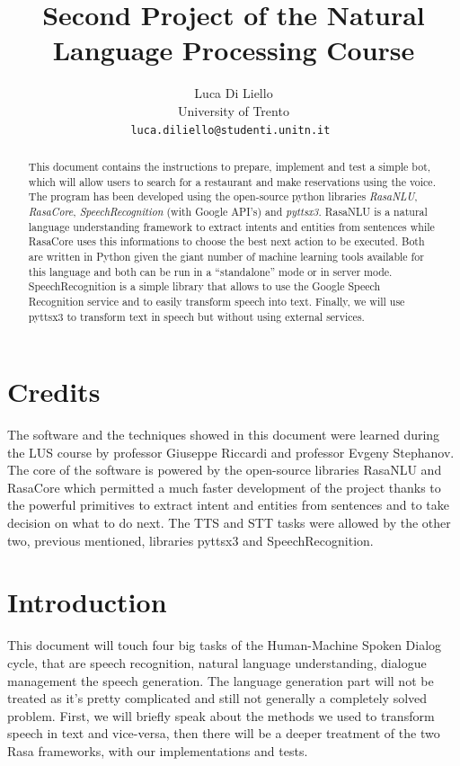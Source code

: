 \documentclass[11pt,a4paper]{article}
\title{Second Project of the Natural Language Processing Course}
\author{Luca Di Liello \\
	University of Trento\\
	{\tt luca.diliello@studenti.unitn.it }
}
\begin{document}
\maketitle

\begin{abstract}

This document contains the instructions to prepare, implement and test a simple bot, which will allow users to search for a restaurant and make reservations using the voice. The program has been developed using the open-source python libraries \textit{RasaNLU}, \textit{RasaCore}, \textit{SpeechRecognition} (with Google API's) and \textit{pyttsx3}. RasaNLU is a natural language understanding framework to extract intents and entities from sentences while RasaCore uses this informations to choose the best next action to be executed. Both are written in Python given the giant number of machine learning tools available for this language and both can be run in a ``standalone'' mode or in server mode. SpeechRecognition is a simple library that allows to use the Google Speech Recognition service and to easily transform speech into text. Finally, we will use pyttsx3 to transform text in speech but without using external services.

\end{abstract}

\section{Credits}

The software and the techniques showed in this document were learned during the LUS course by professor Giuseppe Riccardi and professor Evgeny Stephanov. The core of the software is powered by the open-source libraries RasaNLU and RasaCore which permitted a much faster development of the project thanks to the powerful primitives to extract intent and entities from sentences and to take decision on what to do next. The TTS and STT tasks were allowed by the other two, previous mentioned, libraries pyttsx3 and SpeechRecognition.

\section{Introduction}

This document will touch four big tasks of the Human-Machine Spoken Dialog cycle, that are speech recognition,  natural language understanding, dialogue management the speech generation. The language generation part will not be treated as it's pretty complicated and still not generally a completely solved problem. First, we will briefly speak about the methods we used to transform speech in text and vice-versa, then there will be a deeper treatment of the two Rasa frameworks, with our implementations and tests.
\end{document}

